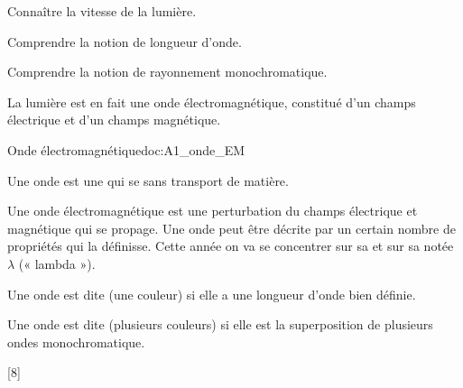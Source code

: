 \teteSndLumi

\vspace*{-30pt}


\begin{objectifs}
  \item Connaître la vitesse de la lumière.
  \item Comprendre la notion de longueur d'onde.
  \item Comprendre la notion de rayonnement monochromatique.
\end{objectifs}

\begin{contexte}
  La lumière est en fait une onde électromagnétique, constitué d'un champs électrique et d'un champs magnétique.
  
\end{contexte}


\begin{doc}{Onde électromagnétique}{doc:A1_onde_EM}
  \begin{importants}
    Une onde est une  qui se  sans transport de matière.
  \end{importants}
  
  Une onde électromagnétique est une perturbation du champs électrique et magnétique qui se propage.
  Une onde peut être décrite par un certain nombre de propriétés qui la définisse.
  Cette année on va se concentrer sur sa  et sur sa  notée $\lambda$ (« lambda »).
  
  \begin{importants}
    Une onde est dite  (une couleur) si elle a une longueur d'onde bien définie.
    
    Une onde est dite  (plusieurs couleurs) si elle est la superposition de plusieurs ondes monochromatique.
  \end{importants}
\end{doc}

[8]


